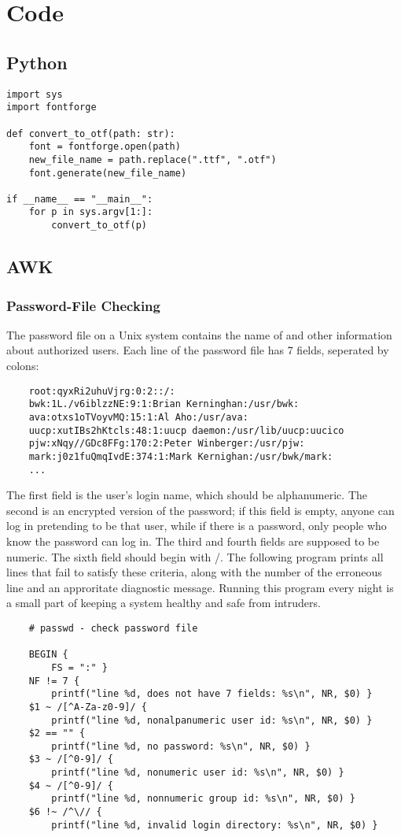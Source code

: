 \section{Code}
\subsection{Python}
\begin{verbatim}
import sys
import fontforge

def convert_to_otf(path: str):
    font = fontforge.open(path)
    new_file_name = path.replace(".ttf", ".otf")
    font.generate(new_file_name)

if __name__ == "__main__":
    for p in sys.argv[1:]:
        convert_to_otf(p)
\end{verbatim}

\subsection{AWK}
\subsubsection{Password-File Checking}
The password file on a Unix system contains the name of and other information
about authorized users. Each line of the password file has 7 fields, seperated
by colons:
\small\begin{verbatim}
    root:qyxRi2uhuVjrg:0:2::/:
    bwk:1L./v6iblzzNE:9:1:Brian Kerninghan:/usr/bwk:
    ava:otxs1oTVoyvMQ:15:1:Al Aho:/usr/ava:
    uucp:xutIBs2hKtcls:48:1:uucp daemon:/usr/lib/uucp:uucico
    pjw:xNqy//GDc8FFg:170:2:Peter Winberger:/usr/pjw:
    mark:j0z1fuQmqIvdE:374:1:Mark Kernighan:/usr/bwk/mark:
    ...
\end{verbatim}
\normalsize
The first field is the user's login name, which should be alphanumeric. The
second is an encrypted version of the password; if this field is empty, anyone
can log in pretending to be that user, while if there is a password, only
people who know the password can log in. The third and fourth fields are
supposed to be numeric. The sixth field should begin with /. The following
program prints all lines that fail to satisfy these criteria, along with the
number of the erroneous line and an approritate diagnostic message. Running
this program every night is a small part of keeping a system healthy and safe
from intruders.

\begin{verbatim}
    # passwd - check password file

    BEGIN {
        FS = ":" }
    NF != 7 {
        printf("line %d, does not have 7 fields: %s\n", NR, $0) }
    $1 ~ /[^A-Za-z0-9]/ {
        printf("line %d, nonalpanumeric user id: %s\n", NR, $0) }
    $2 == "" {
        printf("line %d, no password: %s\n", NR, $0) }
    $3 ~ /[^0-9]/ {
        printf("line %d, nonumeric user id: %s\n", NR, $0) }
    $4 ~ /[^0-9]/ {
        printf("line %d, nonnumeric group id: %s\n", NR, $0) }
    $6 !~ /^\// {
        printf("line %d, invalid login directory: %s\n", NR, $0) }
\end{verbatim}


